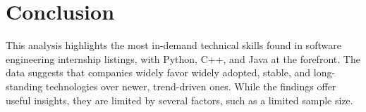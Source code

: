 \documentclass[
	a4paper, %
	10pt, %
	unnumberedsections, %
	twoside, %
]{LTJournalArticle}
\begin{document}

\section{Conclusion}

This analysis highlights the most in-demand technical skills found in software engineering internship listings, with Python, C++, and Java at the forefront. The data suggests that companies widely favor widely adopted, stable, and long-standing technologies over newer, trend-driven ones. While the findings offer useful insights, they are limited by several factors, such as a limited sample size.


\printbibliography %

\end{document}
